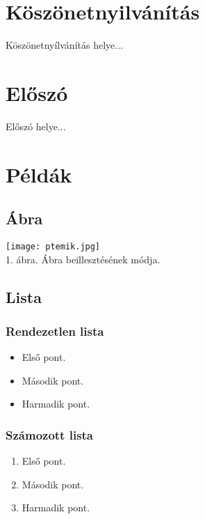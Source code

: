 \documentclass[oneside,a4paper,12pt]{article}
\begin{document}
	\pagebreak
	\setcounter{page}{1}
	\tableofcontents
	
	\pagebreak
	
	\setcounter{page}{1}
	
	\section{Köszönetnyilvánítás}
	Köszönetnyílvánítás helye...
	
	\pagebreak
	
	\section{Előszó}
	Előszó helye...
	\pagebreak
	
	\section{Példák}
	
	\subsection{Ábra}
	
	\begin{center}
		\texttt{[image: ptemik.jpg]}\\
		1. ábra. Ábra beillesztésének módja.\\
	\end{center}
	
	\subsection{Lista}
	
	\subsubsection{Rendezetlen lista}
	\begin{itemize}
		\item Első pont.
		\item Második pont.
		\item Harmadik pont.
	\end{itemize}
	
	\subsubsection{Számozott lista}
	\begin{enumerate}
		\item Első pont.
		\item Második pont.
		\item Harmadik pont.
	\end{enumerate}
	
\end{document}
